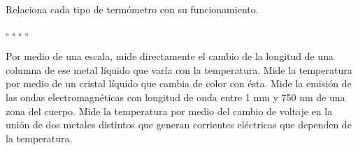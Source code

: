   Relaciona cada tipo de termómetro con su funcionamiento.
    \begin{multicols}{2}
        \begin{choices}
            \choice {}
            $\square$
            \choice {}
            $\square$
            \choice {}
            $\square$
            \choice {}
            $\square$
        \end{choices}
        \vspace{3cm}
        \begin{checkboxes}
            \choice Por medio de una escala, mide directamente el cambio de la longitud de una columna de ese metal líquido que varía con la temperatura.                 \vspace{1cm}
            \choice Mide la temperatura por medio de un cristal líquido que cambia de color con ésta.             \vspace{1cm}
            \choice Mide la emisión de las ondas electromagnéticas con longitud de onda entre 1 mm y 750 nm de una zona del cuerpo.
            \vspace{1cm}
            \choice Mide la temperatura por medio del cambio de voltaje en la unión de dos metales distintos que generan corrientes eléctricas que dependen de la temperatura.
            \vspace{1cm}
        \end{checkboxes}
    \end{multicols}